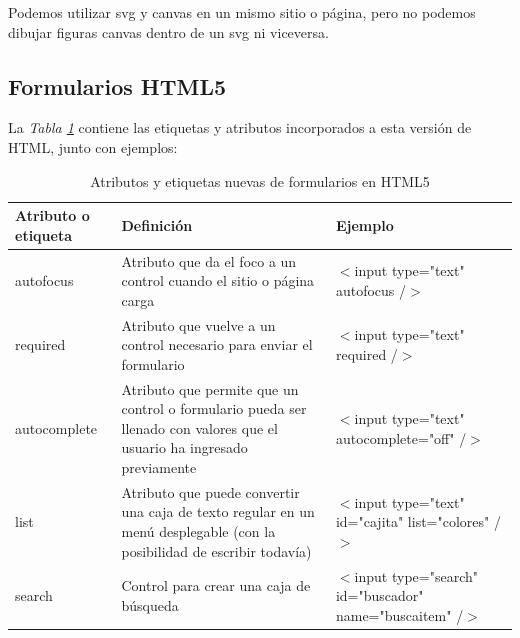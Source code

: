 Podemos utilizar svg y canvas en un mismo sitio o página, pero no podemos dibujar figuras canvas dentro de un svg ni viceversa.


\subsection{Formularios HTML5}
\hspace{0.55cm}La \textit{Tabla \ref{tab: 2}} contiene las etiquetas y atributos incorporados a esta versión de HTML, junto con ejemplos:
\begin{table}[H]
    \begin{center}
        \caption{Atributos y etiquetas nuevas de formularios en HTML5}
        \label{tab: 2}
        \begin{tabular}{m{2.5cm} m{7cm} m{5cm}}
            \hline
            \textbf{Atributo o etiqueta} & \textbf{Definición} & \textbf{Ejemplo} \\
            \hline
            autofocus       & Atributo que da el foco a un control cuando el sitio o página carga                                                           & \parbox{5cm}{$<$input type="text" \\ autofocus /$>$} \\
            required        & Atributo que vuelve a un control necesario para enviar el formulario                                                          & \parbox{5cm}{$<$input type="text" \\ required /$>$} \\
            autocomplete    & Atributo que permite que un control o formulario pueda ser llenado con valores que el usuario ha ingresado previamente        & \parbox{5cm}{$<$input type="text" \\ autocomplete="off" /$>$} \\
            list            & Atributo que puede convertir una caja de texto regular en un menú desplegable (con la posibilidad de escribir todavía)        & \parbox{5cm}{$<$input type="text" \\ id="cajita" \\ list="colores" /$>$} \\
            search          & Control para crear una caja de búsqueda                                                                                       & \parbox{5cm}{$<$input type="search" \\ id="buscador" \\ name="buscaitem" /$>$} \\

\end{tabular}
\end{center}
\end{table}
